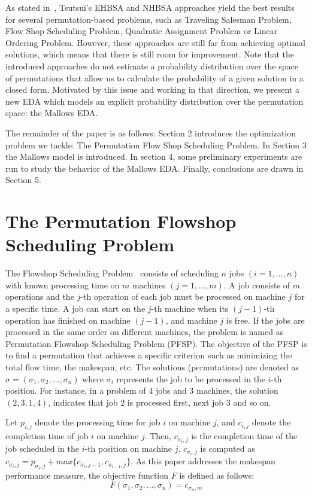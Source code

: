\documentclass[runningheads]{llncs}
\begin{document}
As stated in~\cite{ceberio11b}, Tsutsui's EHBSA and NHBSA approaches yield the best results for several permutation-based problems, such as Traveling Salesman Problem, Flow Shop Scheduling Problem, Quadratic Assignment Problem or Linear Ordering Problem. However, these approaches are still far from achieving optimal solutions, which means that there is still room for improvement. Note that the introduced approaches do not estimate a probability distribution over the space of permutations that allow us to calculate the probability of a given solution in a closed form. Motivated by this issue and working in that direction, we present a new EDA which models an explicit probability distribution over the permutation space: the Mallows EDA.

The remainder of the paper is as follows: Section 2 introduces the optimization problem we tackle: The Permutation Flow Shop Scheduling Problem. In Section 3 the Mallows model is introduced. In section 4, some preliminary experiments are run to study the behavior of the Mallows EDA. Finally, conclusions are drawn in Section 5.

\section{The Permutation Flowshop Scheduling Problem}

The Flowshop Scheduling Problem~\cite{flowshop06} consists of scheduling $n$ jobs $(i=1,\ldots,n)$ with known processing time on $m$ machines $(j=1,\ldots,m)$. A job consists of $m$ operations and the $j$-th operation of each job must be processed on machine $j$ for a specific time. A job can start on the $j$-th machine when its $(j-1)$-th operation has finished on machine $(j-1)$, and machine $j$ is free. If the jobs are processed in the same order on different machines, the problem is named as Permutation Flowshop Scheduling Problem (PFSP). The objective of the PFSP is to find a permutation that achieves a specific criterion such as minimizing the total flow time, the makespan, etc.
The solutions (permutations) are denoted as $\sigma=(\sigma_1,\sigma_2,\ldots,\sigma_n)$ where $\sigma_i$ represents the job to be processed in the $i$-th position. For instance, in a problem of 4 jobs and 3 machines, the solution $(2,3,1,4)$, indicates that job $2$ is processed first, next job 3 and so on.

Let $p_{i,j}$ denote the processing time for job $i$ on machine $j$, and $c_{i,j}$ denote the completion time of job $i$ on machine $j$. Then, $c_{\sigma_i,j}$ is the completion time of the job scheduled in the $i$-th position on machine $j$. $c_{\sigma_i,j}$ is computed as $c_{\sigma_i,j}=p_{\sigma_i,j} + max\{c_{\sigma_i,j-1},c_{\sigma_{i-1},j} \}$. As this paper addresses the makespan performance measure, the objective function $F$  is defined as follows: \[F(\sigma_1,\sigma_2,\ldots,\sigma_n)=c_{\sigma_{n},m}\]
\end{document}
